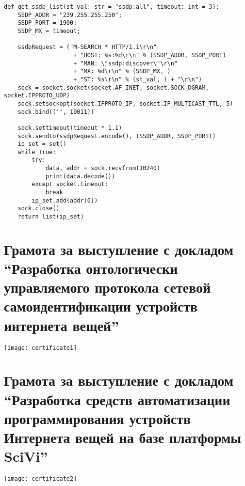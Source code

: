 \begin{verbatim}
def get_ssdp_list(st_val: str = "ssdp:all", timeout: int = 3):
    SSDP_ADDR = "239.255.255.250";
    SSDP_PORT = 1900;
    SSDP_MX = timeout;

    ssdpRequest = ("M-SEARCH * HTTP/1.1\r\n"
                    + "HOST: %s:%d\r\n" % (SSDP_ADDR, SSDP_PORT)
                    + "MAN: \"ssdp:discover\"\r\n"
                    + "MX: %d\r\n" % (SSDP_MX, )
                    + "ST: %s\r\n" % (st_val, ) + "\r\n")
    sock = socket.socket(socket.AF_INET, socket.SOCK_DGRAM, socket.IPPROTO_UDP)
    sock.setsockopt(socket.IPPROTO_IP, socket.IP_MULTICAST_TTL, 5)
    sock.bind(('', 19011))

    sock.settimeout(timeout * 1.1)
    sock.sendto(ssdpRequest.encode(), (SSDP_ADDR, SSDP_PORT))
    ip_set = set()
    while True:
        try:
            data, addr = sock.recvfrom(10240)
            print(data.decode())
        except socket.timeout:
            break
        ip_set.add(addr[0])
    sock.close()
    return list(ip_set)

\end{verbatim}


\chapter{Грамота за выступление с докладом "`Разработка онтологически управляемого протокола сетевой самоидентификации устройств интернета вещей"'}

\texttt{[image: certificate1]}

\chapter{Грамота за выступление с докладом "`Разработка средств автоматизации программирования устройств Интернета вещей на базе платформы SciVi"'}

\texttt{[image: certificate2]}
